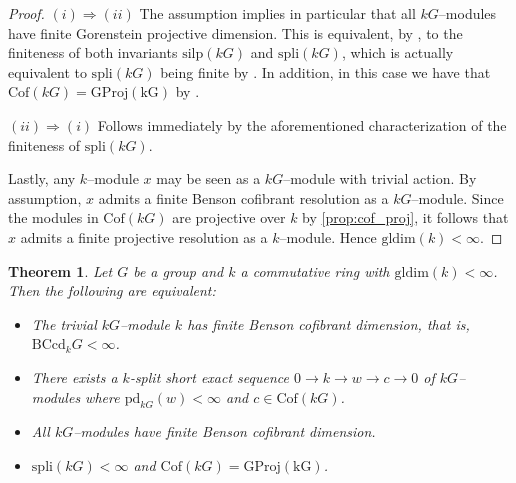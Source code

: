 \documentclass{amsart}
\numberwithin{equation}{section}%
\newtheorem{theorem}[equation]{Theorem}
\theoremstyle{remark}
\begin{document}
{\begin{proof}
$(i)\Rightarrow(ii)$ The assumption implies in particular that all $kG$--modules have finite Gorenstein projective dimension. This is equivalent, by \cite[Theorem~4.1]{CP}, to the finiteness of both invariants $\mathrm{silp}(kG)$ and $\mathrm{spli}(kG)$, which is actually equivalent to $\mathrm{spli}(kG)$ being  finite by \cite[Corollary~24]{DE}. In addition, in this case we have that $\mathrm{Cof}(kG)=\mathrm{GProj(kG)}$ by \cite[Proposition~2.2 (i)]{ET_cof}.

$(ii)\Rightarrow(i)$ Follows immediately by the aforementioned characterization of the finiteness of $\mathrm{spli}(kG)$.

Lastly, any $k$--module $x$ may be seen as a $kG$--module with trivial action. By assumption, $x$ admits a finite Benson cofibrant resolution as a $kG$--module. 
Since the modules in $\mathrm{Cof}(kG)$ are projective over $k$ by \cref{prop:cof_proj}, it follows that $x$ admits a finite projective resolution as a $k$--module. Hence $\mathrm{gldim}(k)<\infty.$
\end{proof}

\begin{theorem}
\label{thm:BCcd}
Let $G$ be a group and $k$ a commutative ring with $\mathrm{gldim}(k)<\infty$. Then the following are equivalent:
\begin{itemize}
    \item[(i)] The trivial $kG$--module $k$ has finite Benson cofibrant dimension, that is, $\mathrm{BCcd}_{k}G<\infty$.
    \item[(ii)] There exists a $k$-split short exact sequence $0\rightarrow k\rightarrow w\rightarrow c\rightarrow 0$ of $kG$--modules where $\mathrm{pd}_{kG}(w)<\infty$ and $c\in\mathrm{Cof}(kG)$.
    \item[(iii)] All $kG$--modules have finite Benson cofibrant dimension.
    \item[(iv)] $\mathrm{spli}(kG)<\infty$ and $\mathrm{Cof}(kG)=\mathrm{GProj(kG)}$.
\end{itemize}
\end{theorem}


}
\end{document}
